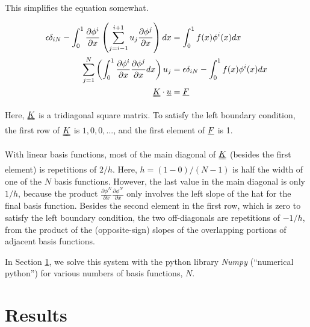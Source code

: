 \documentclass[10pt]{article}
\begin{document}
\pagebreak

This simplifies the equation somewhat.

\begin{equation}
    \label{eqn:tosolve-sum}
    \begin{split}
        \epsilon \delta_{iN} - \int_0^1 \frac{\partial \phi^i}{\partial x} \left( \sum_{j=i-1}^{i+1}u_j \frac{\partial \phi^j}{\partial x} \right) dx &= \int_0^1 f(x) \phi^i(x)dx \\
        \sum_{j=1}^{N} \left(
                \int_0^1 \frac{\partial \phi^i}{\partial x} \frac{\partial \phi^j}{\partial x} dx 
        \right) u_j &= \epsilon \delta_{iN} - \int_0^1 f(x)\phi^i(x)dx \\
        \uuline{K} \cdot \uline{u} &= \uline{F} 
    \end{split}
\end{equation}

Here, $\uuline{K}$ is a tridiagonal square matrix. To satisfy the left boundary condition, the first row of $\uuline{K}$ is $1, 0, 0, ...$, and the first element of $\uline F$ is 1.

With linear basis functions, most of the main diagonal of $\uuline K$ (besides the first element) is repetitions of $2 / h$. Here, $h = (1 - 0) / (N - 1)$ is half the width of one of the $N$ basis functions. However, the last value in the main diagonal is only $1/h$, because the product $\frac{\partial \phi^N}{\partial x} \frac{\partial \phi^N}{\partial x}$ only involves the left slope of the hat for the final basis function. Besides the second element in the first row, which is zero to satisfy the left boundary condition, the two off-diagonals are repetitions of $-1 / h$, from the product of the (opposite-sign) slopes of the overlapping portions of adjacent basis functions.

In Section \ref{sec:results}, we solve this system with the python library \textit{Numpy} (``numerical python'') for various numbers of basis functions, $N$.

\section{Results}
\label{sec:results}
\end{document}
